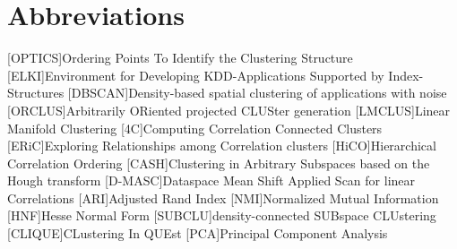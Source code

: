 \chapter*{Abbreviations}
\begin{acronym}
    [OPTICS]{Ordering Points To Identify the Clustering Structure}
    [ELKI]{Environment for Developing KDD-Applications Supported by Index-Structures}
    [DBSCAN]{Density-based spatial clustering of applications with noise}
    [ORCLUS]{Arbitrarily ORiented projected CLUSter generation}
    [LMCLUS]{Linear Manifold Clustering}
    [4C]{Computing Correlation Connected Clusters}
    [ERiC]{Exploring Relationships among Correlation clusters}
    [HiCO]{Hierarchical Correlation Ordering}
    [CASH]{Clustering in Arbitrary Subspaces based on the Hough transform}
    [D-MASC]{Dataspace Mean Shift Applied Scan for linear Correlations}
    [ARI]{Adjusted Rand Index}
    [NMI]{Normalized Mutual Information}
    [HNF]{Hesse Normal Form}
    [SUBCLU]{density-connected SUBspace CLUstering}
    [CLIQUE]{CLustering In QUEst}
    [PCA]{Principal Component Analysis}
\end{acronym}